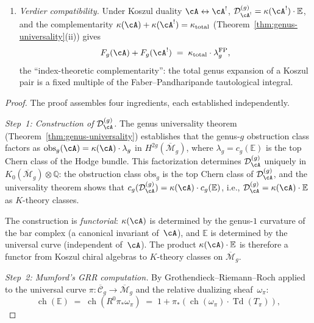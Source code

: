 \begin{theorem}
\begin{enumerate}[label=\textup{(\roman*)}]
\item \emph{Verdier compatibility.}
Under Koszul duality $\cA \leftrightarrow \cA^!$,
$\mathcal{D}_{\cA^!}^{(g)} = \kappa(\cA^!) \cdot \mathbb{E}$,
and the complementarity
$\kappa(\cA) + \kappa(\cA^!) = \kappa_{\mathrm{total}}$
\textup{(}Theorem~\textup{\ref{thm:genus-universality}(ii))}
gives
\[
F_g(\cA) + F_g(\cA^!)
\;=\;
\kappa_{\mathrm{total}} \cdot \lambda_g^{\mathrm{FP}},
\]
the ``index-theoretic complementarity'': the total genus expansion
of a Koszul pair is a fixed multiple of the
Faber--Pandharipande tautological integral.
\end{enumerate}
\end{theorem}

\begin{proof}
The proof assembles four ingredients, each established
independently.

\emph{Step~1: Construction of $\mathcal{D}_{\cA}^{(g)}$.}
The genus universality theorem
(Theorem~\ref{thm:genus-universality}) establishes that the
genus-$g$ obstruction class factors as
$\mathrm{obs}_g(\cA) = \kappa(\cA) \cdot \lambda_g$ in
$H^{2g}(\overline{\mathcal{M}}_g)$, where
$\lambda_g = c_g(\mathbb{E})$ is the top Chern class of the
Hodge bundle.  This factorization determines
$\mathcal{D}_{\cA}^{(g)}$ uniquely in
$K_0(\overline{\mathcal{M}}_g) \otimes \mathbb{Q}$:
the obstruction class $\mathrm{obs}_g$ is the top Chern class of
$\mathcal{D}_{\cA}^{(g)}$, and the universality theorem
shows that $c_g(\mathcal{D}_{\cA}^{(g)}) =
\kappa(\cA) \cdot c_g(\mathbb{E})$, i.e.,
$\mathcal{D}_{\cA}^{(g)} = \kappa(\cA) \cdot \mathbb{E}$
as $K$-theory classes.

The construction is \emph{functorial}: $\kappa(\cA)$ is
determined by the genus-$1$ curvature of the bar complex
(a canonical invariant of~$\cA$), and $\mathbb{E}$ is determined
by the universal curve (independent of~$\cA$).  The product
$\kappa(\cA) \cdot \mathbb{E}$ is therefore a functor from
Koszul chiral algebras to $K$-theory classes on
$\overline{\mathcal{M}}_g$.

\emph{Step~2: Mumford's GRR computation.}
By Grothendieck--Riemann--Roch applied to the universal curve
$\pi \colon \overline{\mathcal{C}}_g \to \overline{\mathcal{M}}_g$
and the relative dualizing sheaf~$\omega_\pi$:
\begin{equation}\label{eq:mumford-grr}
\operatorname{ch}(\mathbb{E})
\;=\;
\operatorname{ch}(R^0\pi_*\omega_\pi)
\;=\;
1 + \pi_*\!\left(
  \operatorname{ch}(\omega_\pi) \cdot
  \operatorname{Td}(T_\pi)
\right),
\end{equation}


\end{proof}
